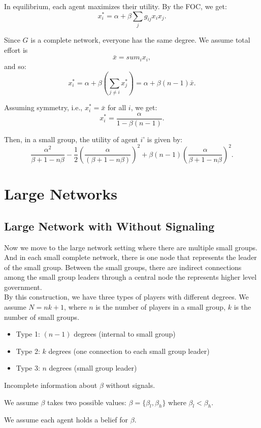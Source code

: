 \documentclass[12pt]{article}
\begin{document}
In equilibrium, each agent maximizes their utility. By the FOC, we get:
\[
x_i^* = \alpha + \beta \sum_j g_{ij}x_i x_j. \tag{2}
\]

Since $G$ is a complete network, everyone has the same degree. We assume total effort is  
\[
\bar{x} = sum_i x_i,
\]
and so:
\[
x_i^* = \alpha + \beta \left( \sum_{j \neq i} x_j^* \right) = \alpha + \beta(n - 1)\bar{x}. \tag{3}
\]

Assuming symmetry, i.e., $x_i^* = \bar{x}$ for all $i$, we get:
\[
x_i^* = \frac{\alpha}{1 - \beta(n - 1)}.
\]

Then, in a small group, the utility of agent $i$' is given by:
\[
\frac{\alpha^2}{\beta + 1 - n\beta} - \frac{1}{2} \left( \frac{\alpha}{(\beta + 1 - n\beta)} \right)^2 + \beta(n - 1) \left( \frac{\alpha}{\beta + 1 - n\beta} \right)^2. \tag{4}
\]


\section{Large Networks}
\subsection{Large Network with Without Signaling}
Now we move to the large network setting where there are multiple small groups. And in each small complete network, there is one node that represents the leader of the small group. Between the small groups, there are indirect connections among the small group leaders through a central node the represents higher level government.\\
By this construction, we have three types of players with different degrees.  
We assume $N = nk + 1$, where $n$ is the number of players in a small group, $k$ is the number of small groups.

\begin{itemize}
    \item Type 1: $(n-1)$ degrees (internal to small group)
    \item Type 2: $k$ degrees (one connection to each small group leader)
    \item Type 3: $n$ degrees (small group leader)
\end{itemize}

Incomplete information about $\beta$ without signals.

We assume $\beta$ takes two possible values: $\beta = \{\beta_l,\beta_h\}$ where $\beta_l < \beta_h$. 

We assume each agent holds a belief for $\beta$.
\end{document}
